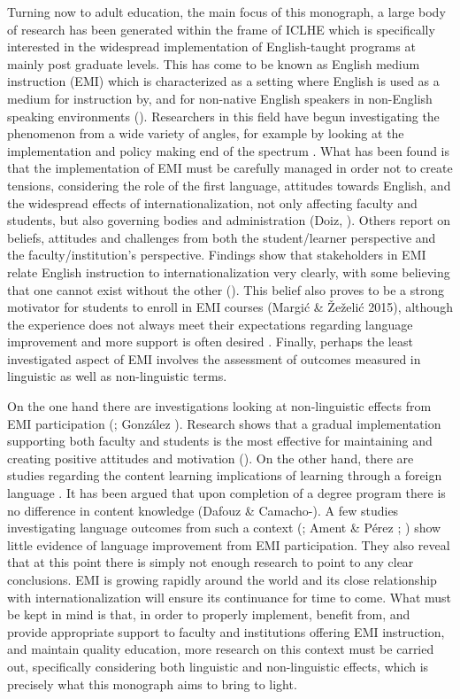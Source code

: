 Turning now to adult education, the main focus of this monograph, a large body of research has been generated within the frame of ICLHE which is specifically interested in the widespread implementation of English-taught programs at mainly post graduate levels. This has come to be known as English medium instruction (EMI) which is characterized as a setting where English is used as a medium for instruction by, and for non-native English speakers in non-English speaking environments (\citealt{HellekjaerHellekjaer2015}). Researchers in this field have begun investigating the phenomenon from a wide variety of angles, for example by looking at the implementation and policy making end of the spectrum \citep{Tudor2007}. What has been found is that the implementation of EMI must be carefully managed in order not to create tensions, considering the role of the first language, attitudes towards English, and the widespread effects of internationalization, not only affecting faculty and students, but also governing bodies and administration (Doiz, \citealt{LasagabasterSierra2014}). Others report on beliefs, attitudes and challenges from both the student/learner perspective and the faculty/institution’s perspective. Findings show that stakeholders in EMI relate English instruction to internationalization very clearly, with some believing that one cannot exist without the other (\citealt{HenryGoddard2015}). This belief also proves to be a strong motivator for students to enroll in EMI courses (Margić \& Žeželić 2015), although the experience does not always meet their expectations regarding language improvement and more support is often desired \citep{Sert2008}. Finally, perhaps the least investigated aspect of EMI involves the assessment of outcomes measured in linguistic as well as non-linguistic terms. 

On the one hand there are investigations looking at non-linguistic effects from EMI participation (\citealt{Gao2008}; González \citealt{Ardeo2016}). Research shows that a gradual implementation supporting both faculty and students is the most effective for maintaining and creating positive attitudes and motivation (\citealt{ChenKraklow2015}). On the other hand, there are studies regarding the content learning implications of learning through a foreign language \citep{Dafouz2014}. It has been argued that upon completion of a degree program there is no difference in content knowledge (Dafouz \& Camacho-\citealt{Miñano2016}). A few studies investigating language outcomes from such a context (\citealt{LeiHu2014}; Ament \& Pérez \citealt{Vidal2015}; \citealt{Ritcher2017}) show little evidence of language improvement from EMI participation. They also reveal that at this point there is simply not enough research to point to any clear conclusions. EMI is growing rapidly around the world and its close relationship with internationalization will ensure its continuance for time to come. What must be kept in mind is that, in order to properly implement, benefit from, and provide appropriate support to faculty and institutions offering EMI instruction, and maintain quality education, more research on this context must be carried out, specifically considering both linguistic and non-linguistic effects, which is precisely what this monograph aims to bring to light. 


